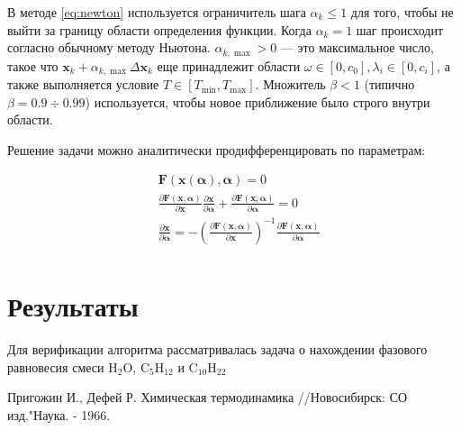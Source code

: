 \documentclass[12pt]{article}
\newcommand{\pd}[2]{\frac{\partial #1}{\partial #2}}
\let\dividesymbol\div
\renewcommand{\div}{\operatorname{div}}
\renewcommand{\leq}{\leqslant}
\begin{document}
В методе \eqref{eq:newton} используется ограничитель шага $\alpha_k \leq 1$ для того, чтобы не выйти за границу области определения функции. Когда $\alpha_k = 1$ шаг происходит согласно обычному методу Ньютона. $\alpha_{k, \max} > 0$ --- это максимальное число, такое что $\mathbf{x}_k + \alpha_{k,\max} \Delta \mathbf{x}_{k}$ еще принадлежит области $\omega \in [0,c_0], \lambda_i \in [0, c_i]$, а также выполняется условие $T \in [T_{\min}, T_{\max}]$. Множитель $\beta < 1$ (типично $\beta = 0.9 \dividesymbol 0.99$) используется, чтобы новое приближение было строго внутри области.

Решение задачи можно аналитически продифференцировать по параметрам:

\begin{equation}
\begin{aligned}
&\mathbf{F}(\mathbf{x}(\boldsymbol \alpha), \boldsymbol \alpha) = 0\\
&\pd{\mathbf{F}(\mathbf{x}, \boldsymbol \alpha)}{\mathbf{x}} \pd{\mathbf{x}}{\boldsymbol \alpha} + \pd{\mathbf{F}(\mathbf{x}, \boldsymbol \alpha)}{\boldsymbol \alpha} = 0\\
&\pd{\mathbf{x}}{\boldsymbol \alpha} = -\left(\pd{\mathbf{F}(\mathbf{x}, \boldsymbol \alpha)}{\mathbf{x}}\right)^{-1} \pd{\mathbf{F}(\mathbf{x}, \boldsymbol \alpha)}{\boldsymbol \alpha} \\
\end{aligned}
\end{equation}

\section{Результаты}
Для верификации алгоритма рассматривалась задача о нахождении фазового равновесия смеси $\mathrm{H_2O}$, $\mathrm{C_5H_{12}}$ и $\mathrm{C_{10}H_{22}}$

\newpage


\begin{thebibliography}{9}
     Пригожин И., Дефей Р. Химическая термодинамика //Новосибирск: СО изд."Наука. - 1966.
\end{thebibliography}
\end{document}
